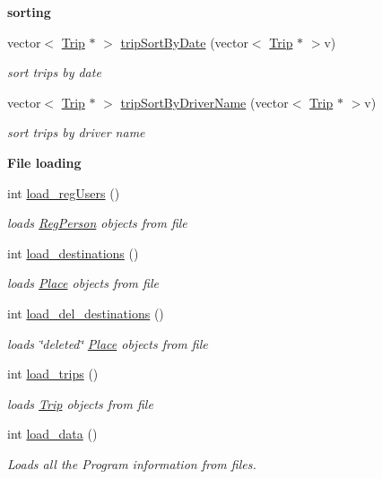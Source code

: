 \begin{Indent}{\bf sorting}\par
\begin{DoxyCompactItemize}
\item 
vector$<$ \hyperlink{class_trip}{Trip} $\ast$ $>$ \hyperlink{class_logic_a702ca737bf6241f57a58b971842e7a26}{trip\+Sort\+By\+Date} (vector$<$ \hyperlink{class_trip}{Trip} $\ast$ $>$v)
\begin{DoxyCompactList}\small\item\em sort trips by date \end{DoxyCompactList}\item 
vector$<$ \hyperlink{class_trip}{Trip} $\ast$ $>$ \hyperlink{class_logic_abd57bee14eeff956fd3aef9d1e4ea5f3}{trip\+Sort\+By\+Driver\+Name} (vector$<$ \hyperlink{class_trip}{Trip} $\ast$ $>$v)
\begin{DoxyCompactList}\small\item\em sort trips by driver name \end{DoxyCompactList}\end{DoxyCompactItemize}
\end{Indent}
\begin{Indent}{\bf File loading}\par
\begin{DoxyCompactItemize}
\item 
int \hyperlink{class_logic_acf0953ed1a6d05d15ef1eeb6e532c87b}{load\+\_\+reg\+Users} ()
\begin{DoxyCompactList}\small\item\em loads \hyperlink{class_reg_person}{Reg\+Person} objects from file \end{DoxyCompactList}\item 
int \hyperlink{class_logic_a91b8242891b029e665d567314282b9a8}{load\+\_\+destinations} ()
\begin{DoxyCompactList}\small\item\em loads \hyperlink{class_place}{Place} objects from file \end{DoxyCompactList}\item 
int \hyperlink{class_logic_ab22c4d90d9907c40e8c2a7cb767c79a0}{load\+\_\+del\+\_\+destinations} ()
\begin{DoxyCompactList}\small\item\em loads \char`\"{}deleted\char`\"{} \hyperlink{class_place}{Place} objects from file \end{DoxyCompactList}\item 
int \hyperlink{class_logic_a1aaf09e6ea84b53e52083a25c65e7557}{load\+\_\+trips} ()
\begin{DoxyCompactList}\small\item\em loads \hyperlink{class_trip}{Trip} objects from file \end{DoxyCompactList}\item 
int \hyperlink{class_logic_a805cbb28970a1667199e4a251830b40d}{load\+\_\+data} ()
\begin{DoxyCompactList}\small\item\em Loads all the Program information from files. \end{DoxyCompactList}\end{DoxyCompactItemize}
\end{Indent}
